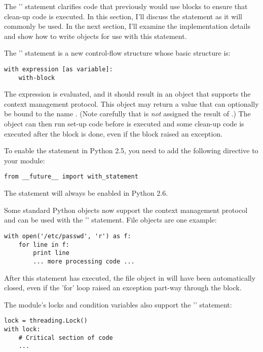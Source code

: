 \documentclass{howto}
\begin{document}
The '' statement clarifies code that previously would
use  blocks to ensure that clean-up code is
executed.  In this section, I'll discuss the statement as it will
commonly be used.  In the next section, I'll examine the
implementation details and show how to write objects for use with this
statement.

The '' statement is a new control-flow structure whose
basic structure is:

\begin{verbatim}
with expression [as variable]:
    with-block
\end{verbatim}

The expression is evaluated, and it should result in an object that
supports the context management protocol.  This object may return a
value that can optionally be bound to the name .  (Note
carefully that  is \emph{not} assigned the result of
.)  The object can then run set-up code
before  is executed and some clean-up code
is executed after the block is done, even if the block raised an exception.

To enable the statement in Python 2.5, you need 
to add the following directive to your module:

\begin{verbatim}
from __future__ import with_statement
\end{verbatim}

The statement will always be enabled in Python 2.6.

Some standard Python objects now support the context management
protocol and can be used with the '' statement. File
objects are one example:

\begin{verbatim}
with open('/etc/passwd', 'r') as f:
    for line in f:
        print line
        ... more processing code ...
\end{verbatim}

After this statement has executed, the file object in  will
have been automatically closed, even if the 'for' loop
raised an exception part-way through the block.

The  module's locks and condition variables 
also support the '' statement:

\begin{verbatim}
lock = threading.Lock()
with lock:
    # Critical section of code
    ...
\end{verbatim}
\end{document}
